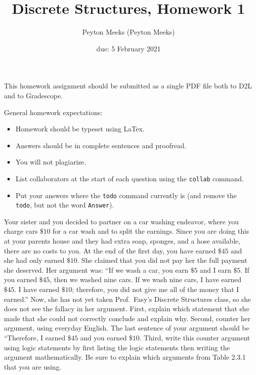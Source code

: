 \documentclass{article}
\title{Discrete Structures, Homework 1}
\author{Peyton Meeks (Peyton Meeks)}
\date{due: 5 February 2021}
\begin{document}
\maketitle

This homework assignment should be
submitted as a single PDF file both to D2L and to Gradescope.

General homework expectations:
\begin{itemize}
    \item Homework should be typeset using LaTex.
    \item Answers should be in complete sentences and proofread.
    \item You will not plagiarize.  \item List collaborators at the start of each question using the \texttt{collab} command.
    \item Put your answers where the \texttt{todo} command currently is (and
        remove the \texttt{todo}, but not the word \texttt{Answer}).
\end{itemize}

 
Your sister and you decided to partner on a car washing endeavor, where you
charge cars $\$10$ for a car wash and to split the earnings.  Since you are
doing this at your parents house and they had extra soap, sponges, and a hose
available, there are no costs to you.  At the end of the first day, you have
earned $\$45$ and she had only earned $\$10$. She claimed that you did not pay
her the full payment she deserved. Her argument was: ``If we wash a car, you
earn $\$5$ and I earn $\$5$.  If you earned $\$45$, then we washed nine cars.  If
we wash nine cars, I have earned $\$45$.  I have earned $\$10$; therefore, you
did not give me all of the money that I earned.''  Now, she has not yet taken
Prof.~Fasy's Discrete Structures class, so she does not see the fallacy in her
argument. First, explain which statement that she made that she could not
correctly conclude and explain why.  Second, counter her argument, using
everyday English. The last sentence of your argument should be ``Therefore, I
earned $\$45$ and you earned $\$10$. Third, write this counter argument using
logic statements by first listing the logic statements then writing the argument
mathematically.  Be sure to explain which arguments from Table 2.3.1 that you
are using.
\end{document}
